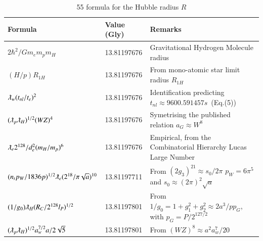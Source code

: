 \documentclass[a4paper,9pt]{article}
\newcounter{col}
\begin{document}
\begin{table}
\caption[Table \ref{tab:6:table6}: 55 Hubble radius formulas]{55 formula for the Hubble radius $R$}
\label{tab:6:table6}
  \hskip-2.0cm\begin{tabular}{lll}
    \toprule
    \cmidrule(r){1-3}
    Formula     & Value (Gly)  & Remarks \\
    \midrule
 
 $ 2\hbar^2/Gm_em_pm_H $ & 13.81197676 & Gravitational Hydrogen Molecule radius \cite{Sanchez2}\\ 
 
 $ (H/p)R_{1H}$ & 13.81197676 & From mono-atomic star limit radius  $R_{1H}$ \cite{Davies} \\
 
 $ \lambdabar_w (t_{nl}/t_e)^2$ & 13.81197676 & Identification predicting $t_{nl}\approx 9600.591457 s$~(Eq.(5)) \\
 
 $ (\lambdabar_{p} \lambdabar_{H})^{1/2} (WZ)^4$  & 13.81197676 & Symetrising the published relation $a_G \approx W^8$ \cite{Rees} \\
 
 $\lambdabar_{e} 2^{128}/d_e^2(m_H/m_p)^6$  & 13.81197676   & Empirical, from the Combinatorial Hierarchy Lucas Large Number \cite{Bastin}\\
 
 
  $(n_tp_W/1836p)^{1/2}\lambdabar_{e} (2^{18}/\pi \sqrt a)^{10}$  & 13.81197711   & From $(2g_3)^{21} \approx s_0/2\pi$ $p_W = 6\pi^5$ and $s_0 \approx (2\pi)^2 \sqrt a$\\
 
 
 
  $ (1/g_0) \lambdabar_H (R_C/2^{128}l_P)^{1/2} $  & 13.81197801 & From $1/g_0 = 1+g_1^2+g_2^2\approx2a^3/pp_G$, with $p_G = P/2^{127/2}$\\ 
 
 
 $ (\lambdabar_{p} \lambdabar_{H})^{1/2} a_w^{7/2} a/2\sqrt 5 $  & 13.81197801 & From $(WZ)^8 \approx a^2a_w^7/20$\\
 
  

\end{tabular}
\end{table}
\end{document}
